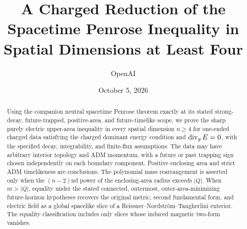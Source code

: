 \documentclass[11pt]{article}
\title{A Charged Reduction of the Spacetime Penrose Inequality in Spatial Dimensions at Least Four}
\author{OpenAI}
\date{October 5, 2026}
\begin{document}
\maketitle
\begin{abstract}
Using the companion neutral spacetime Penrose theorem exactly at its
stated strong-decay, future-trapped, positive-area, and future-timelike
scope, we prove the sharp purely electric upper-area inequality in every
spatial dimension $n\ge4$ for one-ended charged data satisfying the charged
dominant energy condition and $\operatorname{div}_g E=0$, with the specified decay,
integrability, and finite-flux assumptions. The data may have arbitrary interior
topology and ADM momentum, with a future or past trapping sign chosen
independently on each boundary component. Positive enclosing area and
strict ADM timelikeness are conclusions. The polynomial mass rearrangement
is asserted only when the $(n-2)$nd power of the enclosing-area radius
exceeds $|Q|$. When $m>|Q|$, equality under the stated connected,
outermost, outer-area-minimizing future-horizon hypotheses recovers the
original metric, second fundamental form, and electric field as a global
spacelike slice of a Reissner--Nordstr\"om--Tangherlini exterior. The
equality classification includes only slices whose induced magnetic
two-form vanishes.
\end{abstract}
\tableofcontents
\clearpage













\end{document}
